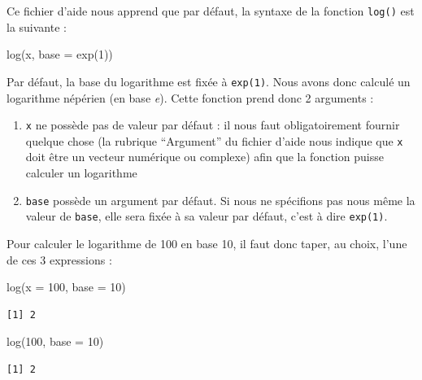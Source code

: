 \documentclass[
  letterpaper,
  DIV=11,
  numbers=noendperiod]{scrreprt}
\newenvironment{Shaded}{\begin{snugshade}}{\end{snugshade}}
\newcommand{\AttributeTok}[1]{\textcolor[rgb]{0.40,0.45,0.13}{#1}}
\newcommand{\DecValTok}[1]{\textcolor[rgb]{0.68,0.00,0.00}{#1}}
\newcommand{\FunctionTok}[1]{\textcolor[rgb]{0.28,0.35,0.67}{#1}}
\newcommand{\NormalTok}[1]{\textcolor[rgb]{0.00,0.23,0.31}{#1}}
\providecommand{\tightlist}{%
  \setlength{\itemsep}{0pt}\setlength{\parskip}{0pt}}\usepackage{longtable,booktabs,array}
\begin{document}
Ce fichier d'aide nous apprend que par défaut, la syntaxe de la fonction
\texttt{log()} est la suivante :

\begin{Shaded}
\begin{Highlighting}[]
\FunctionTok{log}\NormalTok{(x, }\AttributeTok{base =} \FunctionTok{exp}\NormalTok{(}\DecValTok{1}\NormalTok{))}
\end{Highlighting}
\end{Shaded}

Par défaut, la base du logarithme est fixée à \texttt{exp(1)}. Nous
avons donc calculé un logarithme népérien (en base \emph{e}). Cette
fonction prend donc 2 arguments :

\begin{enumerate}
\def\labelenumi{\arabic{enumi}.}
\tightlist
\item
  \texttt{x} ne possède pas de valeur par défaut : il nous faut
  obligatoirement fournir quelque chose (la rubrique ``Argument'' du
  fichier d'aide nous indique que \texttt{x} doit être un vecteur
  numérique ou complexe) afin que la fonction puisse calculer un
  logarithme
\item
  \texttt{base} possède un argument par défaut. Si nous ne spécifions
  pas nous même la valeur de \texttt{base}, elle sera fixée à sa valeur
  par défaut, c'est à dire \texttt{exp(1)}.
\end{enumerate}

Pour calculer le logarithme de 100 en base 10, il faut donc taper, au
choix, l'une de ces 3 expressions :

\begin{Shaded}
\begin{Highlighting}[]
\FunctionTok{log}\NormalTok{(}\AttributeTok{x =} \DecValTok{100}\NormalTok{, }\AttributeTok{base =} \DecValTok{10}\NormalTok{)}
\end{Highlighting}
\end{Shaded}

\begin{verbatim}
[1] 2
\end{verbatim}

\begin{Shaded}
\begin{Highlighting}[]
\FunctionTok{log}\NormalTok{(}\DecValTok{100}\NormalTok{, }\AttributeTok{base =} \DecValTok{10}\NormalTok{)}
\end{Highlighting}
\end{Shaded}

\begin{verbatim}
[1] 2
\end{verbatim}
\end{document}
